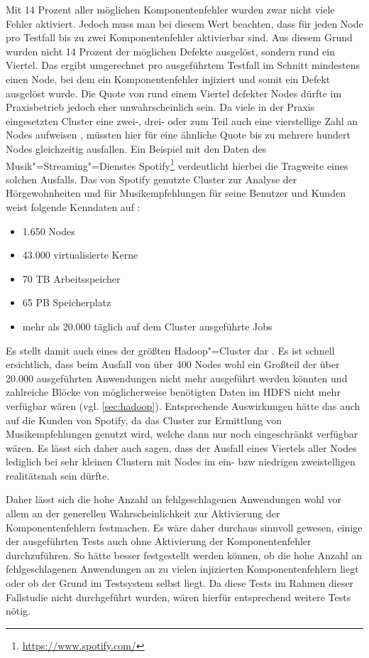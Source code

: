 Mit 14 Prozent aller möglichen Komponentenfehler wurden zwar nicht viele Fehler aktiviert.
Jedoch muss man bei diesem Wert beachten, dass für jeden Node pro Testfall bis zu zwei Komponentenfehler aktivierbar sind.
Aus diesem Grund wurden nicht 14 Prozent der möglichen Defekte ausgelöst, sondern rund ein Viertel.
Das ergibt umgerechnet pro ausgeführtem Testfall im Schnitt mindestens einen Node, bei dem ein Komponentenfehler injiziert und somit ein Defekt ausgelöst wurde.
Die Quote von rund einem Viertel defekter Nodes dürfte im Praxisbetrieb jedoch eher unwahrscheinlich sein.
Da viele in der Praxis eingesetzten Cluster eine zwei-, drei- oder zum Teil auch eine vierstellige Zahl an Nodes aufweisen \cite{PoweredByHadoop}, müssten hier für eine ähnliche Quote bis zu mehrere hundert Nodes gleichzeitig ausfallen.
Ein Beispiel mit den Daten des Musik"=Streaming"=Dienstes Spotify\footnote{\url{https://www.spotify.com/}} verdeutlicht hierbei die Tragweite eines solchen Ausfalls.
Das von Spotify genutzte Cluster zur Analyse der Hörgewohnheiten und für Musikempfehlungen für seine Benutzer und Kunden weist folgende Kenndaten auf \cite{PoweredByHadoop}:

\begin{itemize}
    \item 1.650 Nodes
    \item 43.000 virtualisierte Kerne
    \item 70 TB Arbeitsspeicher
    \item 65 PB Speicherplatz
    \item mehr als 20.000 täglich auf dem Cluster ausgeführte Jobs
\end{itemize}

Es stellt damit auch eines der größten Hadoop"=Cluster dar \cite{PoweredByHadoop}.
Es ist schnell ersichtlich, dass beim Ausfall von über 400 Nodes wohl ein Großteil der über 20.000 ausgeführten Anwendungen nicht mehr ausgeführt werden könnten und zahlreiche Blöcke von möglicherweise benötigten Daten im \gls{HDFS} nicht mehr verfügbar wären (vgl. \cref{sec:hadoop}).
Entsprechende Auswirkungen hätte das auch auf die Kunden von Spotify, da das Cluster \uA zur Ermittlung von Musikempfehlungen genutzt wird, welche dann nur noch eingeschränkt verfügbar wären.
Es lässt sich daher auch sagen, dass der Ausfall eines Viertels aller Nodes lediglich bei sehr kleinen Clustern mit Nodes im ein- bzw niedrigen zweistelligen realitätsnah sein dürfte.

Daher lässt sich die hohe Anzahl an fehlgeschlagenen Anwendungen wohl vor allem an der generellen Wahrscheinlichkeit zur Aktivierung der Komponentenfehlern festmachen.
Es wäre daher durchaus sinnvoll gewesen, einige der ausgeführten Tests auch ohne Aktivierung der Komponentenfehler durchzuführen.
So hätte besser festgestellt werden können, ob die hohe Anzahl an fehlgeschlagenen Anwendungen an zu vielen injizierten Komponentenfehlern liegt oder ob der Grund im Testsystem selbst liegt.
Da diese Tests im Rahmen dieser Fallstudie nicht durchgeführt wurden, wären hierfür entsprechend weitere Tests nötig.

